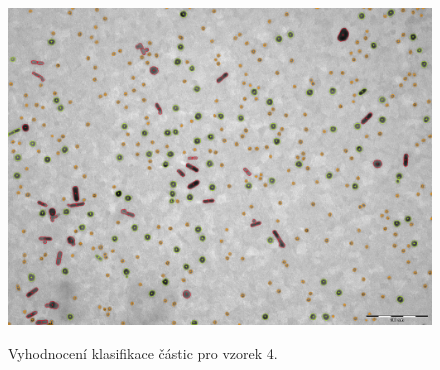 \documentclass[11pt,twoside,a4paper,table]{book}
\begin{document}
\begin{figure}[hb]
\center
\includegraphics[width=\textwidth]{figures/multi6_klasifikace.png}
\label{fig:class1}
\caption{Vyhodnocení klasifikace částic pro vzorek 4.}
\end{figure}
\end{document}
